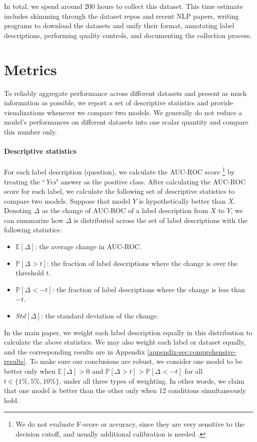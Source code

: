 In total, we spend around 200 hours to collect this dataset. This time estimate includes skimming through the dataset repos and recent NLP papers, writing programs to download the datasets and unify their format, annotating label descriptions, performing quality controls, and documenting the collection process.

\section{Metrics} \label{sec:metrics}
To reliably aggregate performance across different datasets and present as much information as possible, we report a set of descriptive statistics and provide visualizations whenever we compare two models. We generally do not reduce a model's performances on different datasets into one scalar quantity and compare this number only.

\paragraph{Descriptive statistics} For each label description (question), we calculate the AUC-ROC score
\footnote{We do not evaluate F-score or accuracy, since they are very sensitive to the decision cutoff, and usually additional calibration is needed \cite{Zhao2021Calibrate}.} by treating the ``\textit{Yes}" answer as the positive class. After calculating the AUC-ROC score for each label, we calculate the following set of descriptive statistics to compare two models. Suppose that model $Y$ is hypothetically better than $X$. Denoting $\Delta$ as the change of AUC-ROC of a label description from $X$ to $Y$, we can summarize how $\Delta$ is distributed across the set of label descriptions with the following statistics:

\begin{itemize}
    \item $\mathbb{E}[\Delta]$: the average change in AUC-ROC.
    \item $\mathbb{P}[\Delta > t]$: the fraction of label descriptions where the change is over the threshold $t$. 
    \item $\mathbb{P}[\Delta < -t]$: the fraction of label descriptions where the change is less than $-t$. 
    \item $Std[\Delta]$: the standard deviation of the change.
\end{itemize}

In the main paper, we weight each label description equally in this distribution to calculate the above statistics. We may also weight each label or dataset equally, and the corresponding results are in Appendix \ref{appendix-sec:comprehensive-results}.
To make sure our conclusions are robust, we consider one model to be better only when $\mathbb{E}[\Delta] > 0$ and $\mathbb{P}[\Delta > t] > \mathbb{P}[\Delta < -t]$ for all $t \in \{1\%, 5\%, 10\%\}$, under all three types of weighting. In other words,  we claim that one model is better than the other only when 12 conditions simultaneously hold. 

